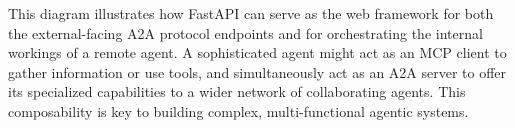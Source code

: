 This diagram illustrates how FastAPI can serve as the web framework for both the external-facing A2A protocol endpoints and for 
orchestrating the internal workings of a remote agent. A sophisticated agent might act as an MCP client to gather information or use tools, 
and simultaneously act as an A2A server to offer its specialized capabilities to a wider network of collaborating agents. 
This composability is key to building complex, multi-functional agentic systems.

